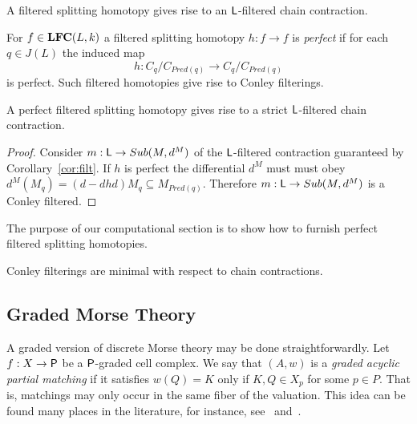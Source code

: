 \begin{cor}\label{cor:filt}
A filtered splitting homotopy gives rise to an ${\mathsf L}$-filtered chain contraction.
\end{cor}

For $f\in {\bf LFC}(L,k)$ a filtered splitting homotopy $h:f\to f$ is {\em perfect} if for each $q\in J(L)$ the induced map $$h:C_q/C_{Pred(q)}\to C_q/C_{Pred(q)}$$ is perfect.  Such filtered homotopies give rise to Conley filterings.

\begin{cor}
A perfect filtered splitting homotopy gives rise to a strict ${\mathsf L}$-filtered chain contraction.
\end{cor}
\begin{proof}
 Consider $m:{\mathsf L}\to Sub(M,d^M)$ of the ${\mathsf L}$-filtered contraction guaranteed by Corollary~\ref{cor:filt}.  If $h$ is perfect the differential $d^M$ must must obey $d^M(M_q) = (d-dhd)M_q\subseteq M_{Pred(q)}$.  Therefore $m:{\mathsf L}\to Sub(M,d^M)$ is a Conley filtered.
\end{proof}

The purpose of our computational section is to show how to furnish perfect filtered splitting homotopies.  


\begin{prop}
Conley filterings are minimal with respect to chain contractions.
\end{prop}

\subsection{Graded Morse Theory}

A graded version of discrete Morse theory may be done straightforwardly.   Let $f:X\to {\mathsf P}$ be a ${\mathsf P}$-graded cell complex.  We say that $(A,w)$ is a {\em graded acyclic partial matching} if it satisfies $w(Q)=K$ only if $K,Q\in X_p$ for some $p\in P$.  That is, matchings may only occur in the same fiber of the valuation.  This idea can be found many places in the literature, for instance, see~\cite{mn} and~\cite[Patchwork Theorem]{koz}.

